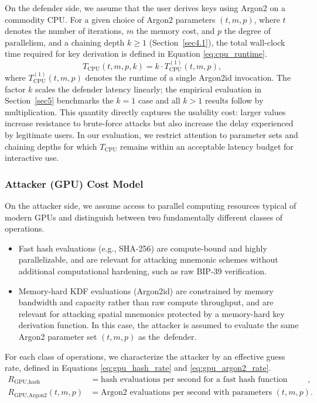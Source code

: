\documentclass[mathematics,article,accept,pdftex,moreauthors]{Definitions/mdpi}
\begin{document}
On the defender side, we assume that the user derives keys using Argon2 on a commodity CPU. For a given choice of Argon2 parameters $(t, m, p)$, where $t$ denotes the number of iterations, $m$ the memory cost, and $p$ the degree of parallelism, and a chaining depth $k \geq 1$ (Section~\ref{sec4.1}), the total wall-clock time required for key derivation is defined in Equation \eqref{eq:cpu_runtime}.
\begin{equation}
T_{\text{CPU}}(t, m, p, k) = k \cdot T_{\text{CPU}}^{(1)}(t, m, p),
\label{eq:cpu_runtime}
\end{equation}
where $T_{\text{CPU}}^{(1)}(t, m, p)$ denotes the runtime of a single Argon2id invocation. {The factor $k$ scales the defender latency linearly; the empirical evaluation in Section~\ref{sec5} benchmarks the $k=1$ case and all $k > 1$ results follow by multiplication.} This quantity directly captures the usability cost: larger values increase resistance to brute-force attacks but also increase the delay experienced by legitimate users. In our evaluation, we restrict attention to parameter sets and chaining depths for which $T_{\text{CPU}}$ remains within an acceptable latency budget for interactive use.

\subsubsection{Attacker (GPU) Cost Model}

On the attacker side, we assume access to parallel computing resources typical of modern GPUs and distinguish between two fundamentally different classes of operations.
\begin{itemize}
\item Fast hash evaluations (e.g., SHA-256) are compute-bound and highly parallelizable, and are relevant for attacking mnemonic schemes without additional computational hardening, such as raw BIP-39 verification.
\item Memory-hard KDF evaluations (Argon2id) are constrained by memory bandwidth and capacity rather than raw compute throughput, and are relevant for attacking spatial mnemonics protected by a memory-hard key derivation function. In this case, the attacker is assumed to evaluate the same Argon2 parameter set $(t, m, p)$ as \mbox{the defender.}
\end{itemize}

For each class of operations, we characterize the attacker by an effective guess rate, defined in Equations \eqref{eq:gpu_hash_rate} and \eqref{eq:gpu_argon2_rate}.
\vspace{-5pt}
\begingroup\makeatletter\def\f@size{9.2}\check@mathfonts
\def\maketag@@@#1{\hbox{\m@th\fontsize{10}{10}\selectfont\normalfont#1}}
\begin{align}
R_{\text{GPU,hash}} &= \text{hash evaluations per second for a fast hash function (e.g., SHA-256)}, \label{eq:gpu_hash_rate} \\
R_{\text{GPU,Argon2}}(t,m,p) &= \text{Argon2 evaluations per second with parameters }(t,m,p). \label{eq:gpu_argon2_rate}
\end{align}
\endgroup
\end{document}
